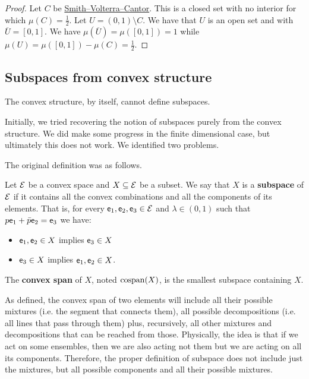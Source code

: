 \begin{proof}
	Let $C$ be \href{https://en.wikipedia.org/wiki/Smith%E2%80%93Volterra%E2%80%93Cantor_set}{Smith–Volterra–Cantor}. This is a closed set with no interior for which $\mu(C) = \frac{1}{2}$. Let $U = (0,1) \setminus C$. We have that $U$ is an open set and with $\overline{U} = [0,1]$. We have $\mu(\overline{U}) = \mu([0,1]) = 1$ while $\mu(U) = \mu([0,1]) - \mu(C) = \frac{1}{2}$.
\end{proof}

\subsection{Subspaces from convex structure}\label{pm_es_failureConvexSubspace}

\begin{insight}
	The convex structure, by itself, cannot define subspaces.
\end{insight}

Initially, we tried recovering the notion of subspaces purely from the convex structure. We did make some progress in the finite dimensional case, but ultimately this does not work. We identified two problems.

The original definition was as follows.

\begin{defn}
	Let $\mathcal{E}$ be a convex space and $X \subseteq \mathcal{E}$ be a subset. We say that $X$ is a \textbf{subspace} of $\mathcal{E}$ if it contains all the convex combinations and all the components of its elements. That is, for every $\mathsf{e}_1, \mathsf{e}_2, \mathsf{e}_3 \in \mathcal{E}$ and $\lambda \in (0,1)$ such that $p \mathsf{e}_1 + \bar{p} \mathsf{e}_2 = \mathsf{e}_3$ we have:
	\begin{itemize}
		\item $\mathsf{e}_1, \mathsf{e}_2 \in X$ implies $\mathsf{e}_3 \in X$
		\item $\mathsf{e}_3 \in X$ implies $\mathsf{e}_1, \mathsf{e}_2 \in X$.
	\end{itemize}
	The \textbf{convex span} of $X$, noted $\mathrm{cospan}(X)$, is the smallest subspace containing $X$.
\end{defn}

\begin{remark}
	As defined, the convex span of two elements will include all their possible mixtures (i.e. the segment that connects them), all possible decompositions (i.e. all lines that pass through them) plus, recursively, all other mixtures and decompositions that can be reached from those. Physically, the idea is that if we act on some ensembles, then we are also acting not them but we are acting on all its components. Therefore, the proper definition of subspace does not include just the mixtures, but all possible components and all their possible mixtures.
\end{remark}

